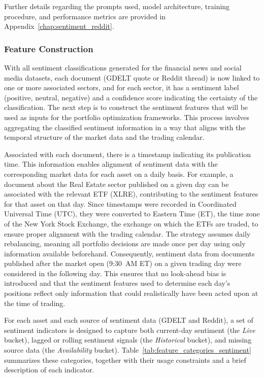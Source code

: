 Further details regarding the prompts used, model architecture, training procedure, and performance metrics are provided in Appendix~\ref{chap:sentiment_reddit}.

\subsubsection{Feature Construction}

With all sentiment classifications generated for the financial news and social media datasets, each document (GDELT quote or Reddit thread) is now linked to one or more associated sectors, and for each sector, it has a sentiment label (positive, neutral, negative) and a confidence score indicating the certainty of the classification. The next step is to construct the sentiment features that will be used as inputs for the portfolio optimization frameworks. This process involves aggregating the classified sentiment information in a way that aligns with the temporal structure of the market data and the trading calendar.

Associated with each document, there is a timestamp indicating its publication time. This information enables alignment of sentiment data with the corresponding market data for each asset on a daily basis. For example, a document about the Real Estate sector published on a given day can be associated with the relevant ETF (XLRE), contributing to the sentiment features for that asset on that day. Since timestamps were recorded in Coordinated Universal Time (UTC), they were converted to Eastern Time (ET), the time zone of the New York Stock Exchange, the exchange on which the ETFs are traded, to ensure proper alignment with the trading calendar. The strategy assumes daily rebalancing, meaning all portfolio decisions are made once per day using only information available beforehand. Consequently, sentiment data from documents published after the market open (9:30~AM ET) on a given trading day were considered in the following day. This ensures that no look-ahead bias is introduced and that the sentiment features used to determine each day's positions reflect only information that could realistically have been acted upon at the time of trading.

For each asset and each source of sentiment data (GDELT and Reddit), a set of sentiment indicators is designed to capture both current-day sentiment (the \textit{Live} bucket), lagged or rolling sentiment signals (the \textit{Historical} bucket), and missing source data (the \textit{Availability} bucket). Table~\ref{tab:feature_categories_sentiment} summarizes these categories, together with their usage constraints and a brief description of each indicator. 

